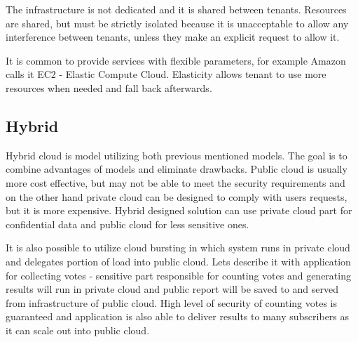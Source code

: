 The infrastructure is not dedicated and it is shared between tenants. Resources are shared, but must be strictly isolated because it is unacceptable to allow any interference between tenants, unless they make an explicit request to allow it.

It is common to provide services with flexible parameters, for example Amazon calls it EC2 - Elastic Compute Cloud. Elasticity allows tenant to use more resources when needed and fall back afterwards. 

\subsection{Hybrid}
Hybrid cloud is model utilizing both previous mentioned models. The goal is to combine advantages of models and eliminate drawbacks. Public cloud is usually more cost effective, but may not be able to meet the security requirements and on the other hand private cloud can be designed to comply with users requests, but it is more expensive. Hybrid designed solution can use private cloud part for confidential data and public cloud for less sensitive ones. 

It is also possible to utilize cloud bursting in which system runs in private cloud and delegates portion of load into public cloud. Lets describe it with application for collecting votes - sensitive part responsible for counting votes and generating results will run in private cloud and public report will be saved to and served from infrastructure of public cloud. High level of security of counting votes is guaranteed and application is also able to deliver results to many subscribers as it can scale out into public cloud.


